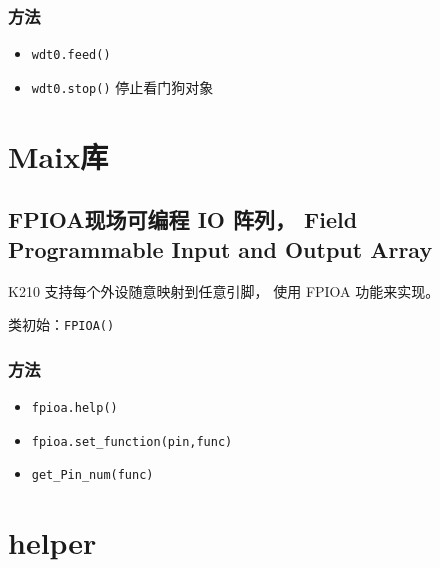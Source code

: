 \documentclass[UTF8]{ctexart}
\begin{document}
    \subsubsection{方法}
    \begin{itemize}
        \item \colorbox{mygrey}{\color{myred}\lstinline|wdt0.feed()|}
        \item \colorbox{mygrey}{\color{myred}\lstinline|wdt0.stop()|}   停止看门狗对象
    \end{itemize}

    \section{Maix库}
    \subsection{FPIOA现场可编程 IO 阵列， Field Programmable Input and Output Array}
    K210 支持每个外设随意映射到任意引脚， 使用 FPIOA 功能来实现。
    \par
    类初始：\colorbox{mygrey}{\color{myred}\lstinline|FPIOA()|}
    \subsubsection{方法}
    \begin{itemize}
        \item \colorbox{mygrey}{\color{myred}\lstinline|fpioa.help()|}
        \item \colorbox{mygrey}{\color{myred}\lstinline|fpioa.set_function(pin,func)|}
        \item \colorbox{mygrey}{\color{myred}\lstinline|get_Pin_num(func)|}
    \end{itemize}
    \section{helper}
\end{document}

